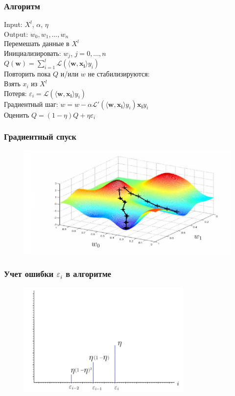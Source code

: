 \documentclass[12pt]{beamer}
\begin{document}
\begin{frame}\frametitle{Алгоритм}
Input: $X^l$, $\alpha$, $\eta$\\
Output: $w_0, w_1, \dots, w_n$\\
\vspace{3mm}
Перемешать данные в $X^l$\\
Инициализировать: $w_j$, $j=0,\dots, n$\\
\hspace{35mm} ${Q}(\mathbf{w}) = \sum\limits_{i=1}^l \mathcal{L}(\langle \mathbf{w}, \mathbf{x_i} \rangle y_i)$\\
Повторить пока $Q$ и/или $w$ не стабилизируются:\\
\hspace{5mm} Взять $x_i$ из $X^l$\\
\hspace{5mm} Потеря: $\varepsilon_i = \mathcal{L}(\langle \mathbf{w}, \mathbf{x_i} \rangle y_i)$\\
\hspace{5mm} Градиентный шаг: $w =  w - \alpha \mathcal{L}'(\langle \mathbf{w}, \mathbf{x_i}\rangle y_i)\mathbf{x_i}y_i$\\
\hspace{5mm} Оценить $Q = (1-\eta)Q + \eta \varepsilon_i$
\end{frame}


\begin{frame}\frametitle{Градиентный спуск}
\begin{figure}[htbp]
  \includegraphics[height=160pt, keepaspectratio = true]{images/gradient_descent2}
\end{figure}
\end{frame}


\begin{frame}\frametitle{Учет ошибки $\varepsilon_i$ в алгоритме}
\begin{figure}[htbp]
  \includegraphics[height=160pt, keepaspectratio = true]{images/l2}
\end{figure}
\end{frame}
\end{document}
